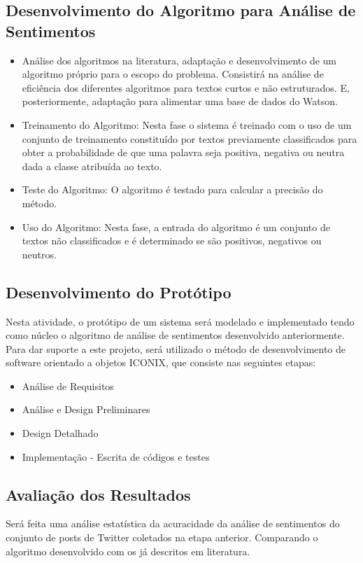\documentclass[
	12pt,				%
	openright,			%
	oneside,			%
	a4paper,			%
	english,			%
	spanish,			%
	brazil				%
	]{abntex2}
\begin{document}
		\subsection*{Desenvolvimento do Algoritmo para Análise de Sentimentos}				

				\begin{itemize}
					\item Análise dos algoritmos na literatura, adaptação e desenvolvimento de um algoritmo próprio para o escopo do problema.	Consistirá na análise de eficiência dos diferentes algoritmos para textos curtos e não estruturados. E, posteriormente, adaptação para alimentar uma base de dados do Watson.

					\item Treinamento do Algoritmo: Nesta fase o sistema é treinado com o uso de um conjunto de treinamento constituído por textos previamente classificados para obter a probabilidade de que uma palavra seja positiva, negativa ou neutra dada a classe atribuída ao texto.
					\item Teste do Algoritmo: O algoritmo é testado para calcular a precisão do método.
					\item Uso do Algoritmo: Nesta fase, a entrada do algoritmo é um conjunto de textos não classificados e é determinado se são positivos, negativos ou neutros.
				\end{itemize}
				
		\subsection*{Desenvolvimento do Protótipo}
		
		Nesta atividade, o protótipo de um sistema será modelado e implementado tendo como núcleo o algoritmo de análise de sentimentos desenvolvido anteriormente. Para dar suporte a este projeto, será utilizado o método de desenvolvimento de software orientado a objetos ICONIX, que consiste nas seguintes etapas: 
		
				\begin{itemize}
					\item Análise de Requisitos
					\item Análise e Design Preliminares
					\item Design Detalhado
					\item Implementação - Escrita de códigos e testes 
					
				\end{itemize}
				
		\subsection*{Avaliação dos Resultados}
		Será feita uma análise estatística da acuracidade da análise de sentimentos do conjunto de posts de Twitter coletados na etapa anterior. Comparando o algoritmo desenvolvido com os já descritos em literatura.
	
\end{document}
